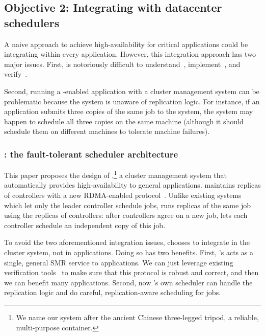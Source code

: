 \vspace{-.15in}\subsection{Objective 2: Integrating \falcon with datacenter 
schedulers}\label{sec:scheduler}\vspace{-.075in}

A naive approach to achieve high-availability for critical applications could 
be integrating \paxos within every application. However, this integration 
approach has two major issues. First, \paxos is notoriously difficult 
to understand~\cite{raft:usenix14}, implement~\cite{paxos:practical}, and 
verify~\cite{demeter:sosp11}.

Second, running a \paxos-enabled application with a 
cluster management system can be problematic because the system is unaware 
of replication logic. For instance, if an application submits three copies of 
the same job to the system, the system may happen to schedule all three 
copies on the same machine (although it should schedule them on 
different machines to tolerate machine failures).

\vspace{-.15in}\subsubsection{\tripod: the fault-tolerant scheduler 
architecture} 
\label{sec:scheduler-arch}\vspace{-.075in}

This paper proposes the design of \tripod,\footnote{We name our system after 
the ancient Chinese three-legged tripod, a reliable, multi-purpose container.} 
a cluster management system that automatically provides high-availability to 
general applications. \tripod maintains replicas of controllers with a new 
RDMA-enabled \paxos protocol~\cite{falcon:github}. Unlike existing systems 
which let only the leader controller schedule jobs, \tripod runs replicas of 
the same job using the replicas of controllers: after controllers agree on a 
new job, \tripod lets each controller schedule an independent copy of this job.

To avoid the two aforementioned integration issues, \tripod chooses to 
integrate 
\paxos in the cluster system, not in applications. Doing so has two benefits. 
First, \tripod's \paxos acts as a single, general SMR service to applications. 
We 
can just leverage existing verification 
tools~\cite{modist:nsdi09,demeter:sosp11} to make sure that this \paxos 
protocol is robust and correct, and then we can benefit many applications. 
Second, now \tripod's own scheduler can handle the replication logic and do 
careful, replication-aware scheduling for jobs.

